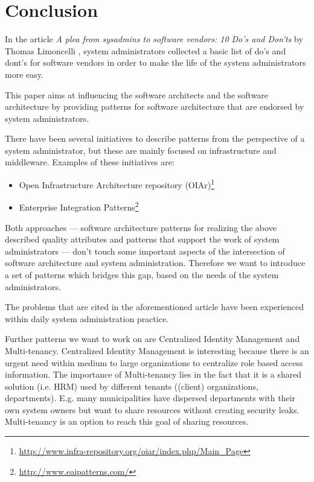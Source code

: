 \section{Conclusion} 


In the article \textit{A plea from sysadmins to software vendors: 10 Do's and Don'ts} by Thomas Limoncelli \cite{Limoncelli2011a}, system administrators collected a basic list of do's and dont's for software vendors in order to make the life of the system administrators more easy. 

This paper aims at influencing the software architects and the software architecture by providing patterns for software architecture that are endorsed by system administrators.

There have been several initiatives to describe patterns from the perspective of a system administrator, but these are mainly focused on infrastructure and middleware. Examples of these initiatives are: 
\begin{itemize}
	\item Open Infrastructure Architecture repository (OIAr)\footnote{\url{http://www.infra-repository.org/oiar/index.php/Main_Page}} 
	\item Enterprise Integration Patterns\footnote{\url{http://www.eaipatterns.com/}}
\end{itemize}

Both approaches --- software architecture patterns for realizing the above described quality attributes and patterns that support the work of system administrators --- don't touch some important aspects of the intersection of software architecture and system administration. Therefore we want to introduce a set of patterns which bridges this gap, based on the needs of the system administrators. 

The problems that are cited in the aforementioned article have been experienced within daily system administration practice. 

Further patterns we want to work on are {\sc Centralized Identity Management} and {\sc Multi-tenancy}. {\sc Centralized Identity Management} is interesting because there is an urgent need within medium to large organizations to centralize role based access information. The importance of {\sc Multi-tenancy} lies in the fact that it is a shared solution (i.e. HRM) used by different tenants ((client) organizations, departments). E.g. many municipalities have dispersed departments with their own system owners but want to share resources without creating security leaks. Multi-tenancy is an option to reach this goal of sharing resources.


